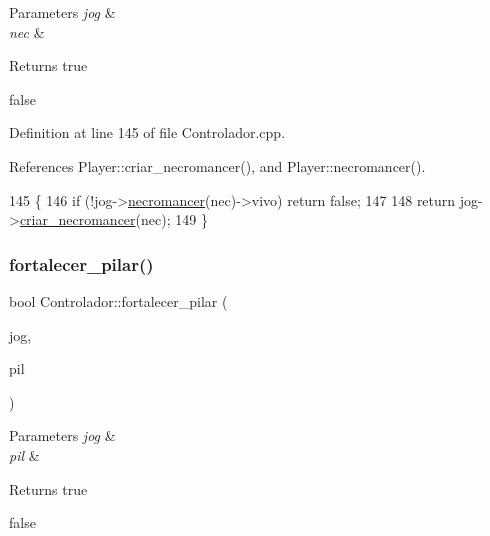 \begin{DoxyParams}{Parameters}
{\em jog} & \\
\hline
{\em nec} & \\
\hline
\end{DoxyParams}
\begin{DoxyReturn}{Returns}
true 

false 
\end{DoxyReturn}


Definition at line 145 of file Controlador.\+cpp.



References Player\+::criar\+\_\+necromancer(), and Player\+::necromancer().


\begin{DoxyCode}
145                                                                          \{
146     \textcolor{keywordflow}{if} (!jog->\mbox{\hyperlink{class_player_a560ffc698994e73527433dd2bf4d2c0d}{necromancer}}(nec)->vivo) \textcolor{keywordflow}{return} \textcolor{keyword}{false};
147 
148     \textcolor{keywordflow}{return} jog->\mbox{\hyperlink{class_player_a118c76695a9c1f362a5371381bfe5be3}{criar\_necromancer}}(nec);
149 \}
\end{DoxyCode}
\mbox{\label{class_controlador_a7c0445d2f378ff7d9b26d2cc77059484}} 
\subsubsection{\texorpdfstring{fortalecer\+\_\+pilar()}{fortalecer\_pilar()}}
{\footnotesize\ttfamily bool Controlador\+::fortalecer\+\_\+pilar (\begin{DoxyParamCaption}\item[{\mbox{\hyperlink{class_player}{Player}} $\ast$}]{jog,  }\item[{Tipo\+Pilar}]{pil }\end{DoxyParamCaption})}


\begin{DoxyParams}{Parameters}
{\em jog} & \\
\hline
{\em pil} & \\
\hline
\end{DoxyParams}
\begin{DoxyReturn}{Returns}
true 

false 
\end{DoxyReturn}


